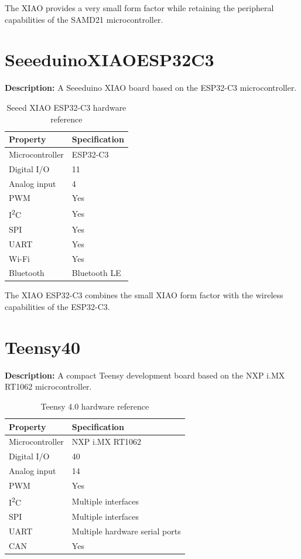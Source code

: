 The XIAO provides a very small form factor while retaining the peripheral
capabilities of the SAMD21 microcontroller.

\newpage
\section{SeeeduinoXIAOESP32C3}

\textbf{Description:} A Seeeduino XIAO board based on the ESP32-C3
microcontroller.

\begin{table}[H]
\centering
\caption{Seeed XIAO ESP32-C3 hardware reference}
\label{tab:board-xiao-esp32-c3}
\begin{tabular}{ll}
\toprule
\textbf{Property} & \textbf{Specification} \\
\midrule
Microcontroller & ESP32-C3 \\
Digital I/O & 11 \\
Analog input & 4 \\
PWM & Yes \\
I\textsuperscript{2}C & Yes \\
SPI & Yes \\
UART & Yes \\
Wi-Fi & Yes \\
Bluetooth & Bluetooth LE \\
\bottomrule
\end{tabular}
\end{table}

The XIAO ESP32-C3 combines the small XIAO form factor with the wireless
capabilities of the ESP32-C3.
\section{Teensy40}

\textbf{Description:} A compact Teensy development board based on the
NXP i.MX RT1062 microcontroller.

\begin{table}[H]
\centering
\caption{Teensy 4.0 hardware reference}
\label{tab:board-teensy40}
\begin{tabular}{ll}
\toprule
\textbf{Property} & \textbf{Specification} \\
\midrule
Microcontroller & NXP i.MX RT1062 \\
Digital I/O & 40 \\
Analog input & 14 \\
PWM & Yes \\
I\textsuperscript{2}C & Multiple interfaces \\
SPI & Multiple interfaces \\
UART & Multiple hardware serial ports \\
CAN & Yes \\
\bottomrule
\end{tabular}
\end{table}


